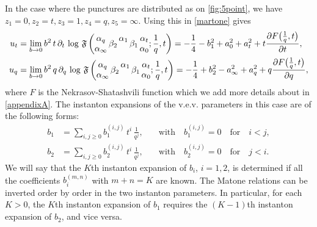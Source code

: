 \documentclass[11pt]{article}
\numberwithin{equation}{section}
\begin{document}
In the case where the punctures are distributed as on   \autoref{fig:5point}, we have $z_1=0, z_2=t, z_3=1, z_4=q, z_5=\infty $. Using this  in \eqref{martone} gives 
\begin{align}
u_{t}&=\lim_{b\to 0}b^2\,t\,\partial_{t}\,\log\,\mathfrak{F}\left(\begin{matrix} \alpha_{q} \\ \alpha_{\infty}\end{matrix}\,\beta_{2}\,
\begin{matrix} \alpha_{1} \\ ~\end{matrix}\, \beta_1\,
\begin{matrix}  \alpha_{t} \\ \alpha_0\end{matrix};\frac{1}{q}, t\right)=-\frac{1}{4}- b_1^2 + a_0^2 + a_t^2+t\frac{\partial F\big({1\over q},t\big)}{\partial t},\label{Matonet}\\
u_{q}&=\lim_{b\to 0}b^2\,q\,\partial_{q}\,\log\,\mathfrak{F}\left(\begin{matrix} \alpha_{q} \\ \alpha_{\infty}\end{matrix}\,\beta_{2}\,
\begin{matrix} \alpha_{1} \\ ~\end{matrix}\, \beta_1\,
\begin{matrix}  \alpha_{t} \\ \alpha_0\end{matrix};\frac{1}{q}, t\right)=-\frac{1}{4}+b_2^2-a_{\infty}^2+a_{q}^2+q\frac{\partial F\big({1\over q},t\big)}{\partial q},\label{Matoneq}
\end{align}
where $F$ is the Nekrasov-Shatashvili  function which we add more details about in \autoref{appendixA}. 
The instanton expansions of the v.e.v. parameters in this case are of the following forms:
\begin{equation}\label{matone7d}
\begin{aligned}
b_1&=\sum_{i,j\ge 0}b_1^{(i,j)}\,t^i\,\frac{1}{q^j},\quad &\text{with}\quad b_1^{(i,j)}=0\quad\text{for}\quad i<j,\\
b_2&=\sum_{i,j\ge 0}b_2^{(i,j)}\,t^i\,\frac{1}{q^j},\quad &\text{with}\quad b_2^{(i,j)}=0\quad\text{for}\quad j<i.
\end{aligned}
\end{equation}
We will say that the $K$th instanton expansion of $b_i$, $i=1,2$, is determined if all the coefficients $b_i^{(m,n)}$ with $m+n=K$ are known.
The Matone relations can be inverted order by order in the two instanton parameters. In particular, for each $K>0$, the $K$th instanton expansion of $b_1$ requires the $(K-1)$th instanton expansion of $b_2$, and vice versa.
\end{document}
